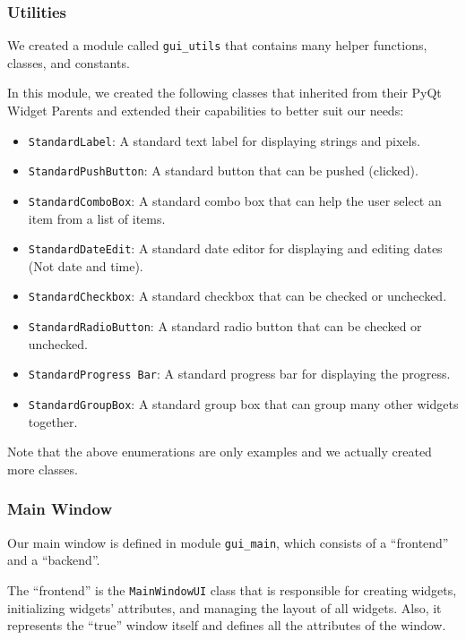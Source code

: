 \documentclass[fontsize=11pt]{article}
\begin{document}
    \subsubsection{Utilities}

    We created a module called \verb|gui_utils| that contains many helper functions, classes, and constants.

    In this module, we created the following classes that inherited from their PyQt Widget Parents and extended their capabilities to better suit our needs:

    \begin{itemize}
        \item \verb|StandardLabel|: A standard text label for displaying strings and pixels.
        \item \verb|StandardPushButton|: A standard button that can be pushed (clicked).
        \item \verb|StandardComboBox|: A standard combo box that can help the user select an item from a list of items.
        \item \verb|StandardDateEdit|: A standard date editor for displaying and editing dates (Not date and time).
        \item \verb|StandardCheckbox|: A standard checkbox that can be checked or unchecked.
        \item \verb|StandardRadioButton|: A standard radio button that can be checked or unchecked.
        \item \verb|StandardProgress Bar|: A standard progress bar for displaying the progress.
        \item \verb|StandardGroupBox|: A standard group box that can group many other widgets together.
    \end{itemize}

    Note that the above enumerations are only examples and we actually created more classes.

    \subsubsection{Main Window}

    Our main window is defined in module \verb|gui_main|, which consists of a ``frontend'' and a ``backend''.

    The ``frontend'' is the \verb|MainWindowUI| class that is responsible for creating widgets, initializing widgets' attributes, and managing the layout of all widgets. Also, it represents the ``true'' window itself and defines all the attributes of the window.
\end{document}
